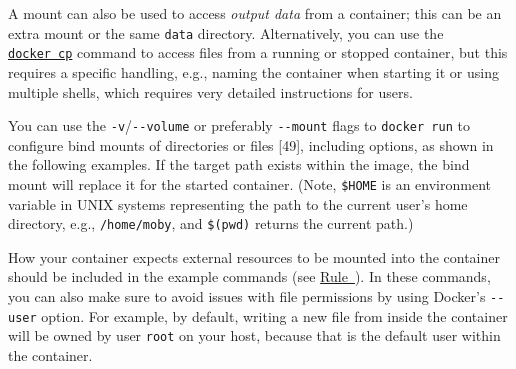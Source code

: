 \documentclass[10pt,letterpaper]{article}
\newenvironment{Shaded}{\begin{snugshade}}{\end{snugshade}}
\newcommand{\BuiltInTok}[1]{#1}
\newcommand{\CommentTok}[1]{\textcolor[rgb]{0.56,0.35,0.01}{\textit{#1}}}
\newcommand{\ExtensionTok}[1]{#1}
\newcommand{\NormalTok}[1]{#1}
\newcommand{\VariableTok}[1]{\textcolor[rgb]{0.00,0.00,0.00}{#1}}
\begin{document}
A mount can also be used to access \emph{output data} from a container;
this can be an extra mount or the same \texttt{data} directory.
Alternatively, you can use the
\href{https://docs.docker.com/engine/reference/commandline/cp/}{\texttt{docker\ cp}}
command to access files from a running or stopped container, but this
requires a specific handling, e.g., naming the container when starting
it or using multiple shells, which requires very detailed instructions
for users.

You can use the \texttt{-v}/\texttt{-\/-volume} or preferably
\texttt{-\/-mount} flags to \texttt{docker\ run} to configure bind
mounts of directories or files {[}49{]}, including options, as shown in
the following examples. If the target path exists within the image, the
bind mount will replace it for the started container. (Note,
\texttt{\$HOME} is an environment variable in UNIX systems representing
the path to the current user's home directory, e.g.,
\texttt{/home/moby}, and \texttt{\$(pwd)} returns the current path.)

\footnotesize

\begin{Shaded}
\end{Shaded}

\normalsize

How your container expects external resources to be mounted into the
container should be included in the example commands (see
\hyperref[{rule:formatting}]{Rule~}). In
these commands, you can also make sure to avoid issues with file
permissions by using Docker's \texttt{-\/-user} option. For example, by
default, writing a new file from inside the container will be owned by
user \texttt{root} on your host, because that is the default user within
the container.
\end{document}
